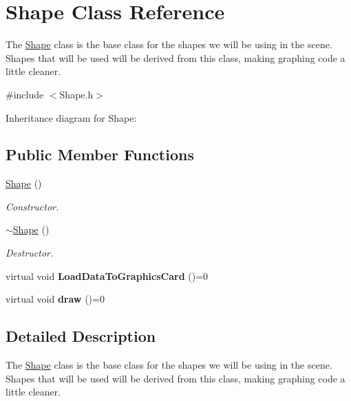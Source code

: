 \hypertarget{class_shape}{}\section{Shape Class Reference}
\label{class_shape}


The \hyperlink{class_shape}{Shape} class is the base class for the shapes we will be using in the scene. Shapes that will be used will be derived from this class, making graphing code a little cleaner.  




{\ttfamily \#include $<$Shape.\+h$>$}



Inheritance diagram for Shape\+:
\subsection*{Public Member Functions}
\begin{DoxyCompactItemize}
\item 
\hyperlink{class_shape_aaa8d87171e65e0d8ba3c5459978992a7}{Shape} ()
\begin{DoxyCompactList}\small\item\em Constructor. \end{DoxyCompactList}\item 
\mbox{\label{class_shape_a935afc9e576015f967d90de56977167d}} 
\hyperlink{class_shape_a935afc9e576015f967d90de56977167d}{$\sim$\+Shape} ()
\begin{DoxyCompactList}\small\item\em Destructor. \end{DoxyCompactList}\item 
\mbox{\label{class_shape_a7f3122c854e63aa880cc7f2a7323a75d}} 
virtual void {\bfseries Load\+Data\+To\+Graphics\+Card} ()=0
\item 
\mbox{\label{class_shape_afacc5aad8e37308c3ce8fef768199b05}} 
virtual void {\bfseries draw} ()=0
\end{DoxyCompactItemize}


\subsection{Detailed Description}
The \hyperlink{class_shape}{Shape} class is the base class for the shapes we will be using in the scene. Shapes that will be used will be derived from this class, making graphing code a little cleaner. 

